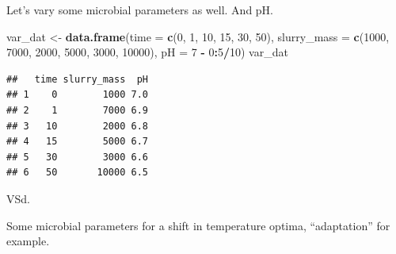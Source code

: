 \documentclass[
]{article}
\newenvironment{Shaded}{\begin{snugshade}}{\end{snugshade}}
\newcommand{\AttributeTok}[1]{\textcolor[rgb]{0.13,0.29,0.53}{#1}}
\newcommand{\ControlFlowTok}[1]{\textcolor[rgb]{0.13,0.29,0.53}{\textbf{#1}}}
\newcommand{\DecValTok}[1]{\textcolor[rgb]{0.00,0.00,0.81}{#1}}
\newcommand{\FunctionTok}[1]{\textcolor[rgb]{0.13,0.29,0.53}{\textbf{#1}}}
\newcommand{\NormalTok}[1]{#1}
\newcommand{\OtherTok}[1]{\textcolor[rgb]{0.56,0.35,0.01}{#1}}
\newcommand{\SpecialCharTok}[1]{\textcolor[rgb]{0.81,0.36,0.00}{\textbf{#1}}}
\begin{document}
Let's vary some microbial parameters as well. And pH.

\begin{Shaded}
\begin{Highlighting}[]
\NormalTok{var\_dat }\OtherTok{\textless{}{-}} \FunctionTok{data.frame}\NormalTok{(}\AttributeTok{time =} \FunctionTok{c}\NormalTok{(}\DecValTok{0}\NormalTok{, }\DecValTok{1}\NormalTok{, }\DecValTok{10}\NormalTok{, }\DecValTok{15}\NormalTok{, }\DecValTok{30}\NormalTok{, }\DecValTok{50}\NormalTok{), }
                      \AttributeTok{slurry\_mass =} \FunctionTok{c}\NormalTok{(}\DecValTok{1000}\NormalTok{, }\DecValTok{7000}\NormalTok{, }\DecValTok{2000}\NormalTok{, }\DecValTok{5000}\NormalTok{, }\DecValTok{3000}\NormalTok{, }\DecValTok{10000}\NormalTok{),}
                      \AttributeTok{pH =} \DecValTok{7} \SpecialCharTok{{-}} \DecValTok{0}\SpecialCharTok{:}\DecValTok{5}\SpecialCharTok{/}\DecValTok{10}\NormalTok{)}
\NormalTok{var\_dat}
\end{Highlighting}
\end{Shaded}

\begin{verbatim}
##   time slurry_mass  pH
## 1    0        1000 7.0
## 2    1        7000 6.9
## 3   10        2000 6.8
## 4   15        5000 6.7
## 5   30        3000 6.6
## 6   50       10000 6.5
\end{verbatim}

VSd.

\begin{Shaded}
\end{Shaded}

Some microbial parameters for a shift in temperature optima,
``adaptation'' for example.

\begin{Shaded}
\end{Shaded}
\end{document}
